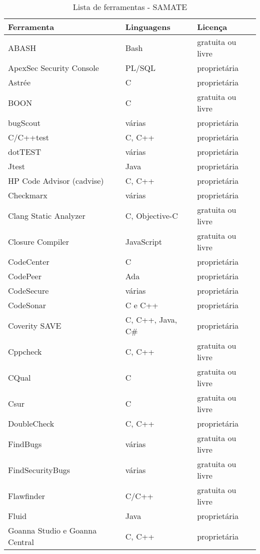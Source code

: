 \begin{center}
  \begin{longtable}{ l | l | l }
      \caption{Lista de ferramentas - SAMATE}\\
\hline
Ferramenta &   Linguagens  & Licença \\ \hline
ABASH &   Bash  & gratuita ou livre \\ \hline
ApexSec Security Console &  PL/SQL   & proprietária \\ \hline
Astrée &  C   & proprietária \\ \hline
BOON &  C & gratuita ou livre \\ \hline
bugScout &  várias  & proprietária \\ \hline
C/C++test & C, C++  & proprietária \\ \hline
dotTEST &  várias & proprietária \\ \hline
Jtest & Java & proprietária \\ \hline
HP Code Advisor (cadvise) &   C, C++  & proprietária \\ \hline
Checkmarx & várias & proprietária \\ \hline
Clang Static Analyzer &  C, Objective-C  & gratuita ou livre \\ \hline
Closure Compiler &  JavaScript  & gratuita ou livre \\ \hline
CodeCenter &  C   & proprietária \\ \hline
CodePeer &  Ada   & proprietária \\ \hline
CodeSecure &  várias  & proprietária \\ \hline
CodeSonar &   C e C++   & proprietária \\ \hline
Coverity SAVE &  C, C++, Java, C\#  & proprietária \\ \hline
Cppcheck &  C, C++  & gratuita ou livre \\ \hline
CQual &   C   & gratuita ou livre \\ \hline
Csur &  C   & gratuita ou livre \\ \hline
DoubleCheck &   C, C++  & proprietária \\ \hline
FindBugs &  várias  & gratuita ou livre \\ \hline
FindSecurityBugs &  várias   & gratuita ou livre \\ \hline
Flawfinder &  C/C++   & gratuita ou livre \\ \hline
Fluid &   Java & proprietária \\ \hline
Goanna Studio e Goanna Central &  C, C++  & proprietária \\ \hline

\end{longtable}
\end{center}

